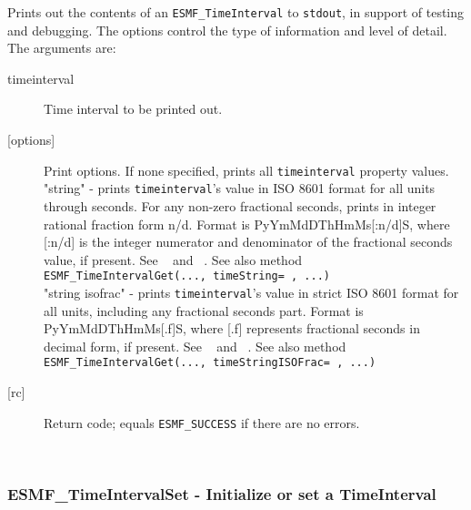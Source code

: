        Prints out the contents of an {\tt ESMF\_TimeInterval} to {\tt stdout},
       in support of testing and debugging.  The options control the type of
       information and level of detail. \\
  
       The arguments are:
       \begin{description}
       \item[timeinterval]
            Time interval to be printed out.
       \item[{[options]}]
            Print options.  If none specified, prints all {\tt timeinterval}
            property values. \\
            "string" - prints {\tt timeinterval}'s value in ISO 8601 format
                       for all units through seconds.  For any non-zero
                       fractional seconds, prints in integer rational
                       fraction form n/d.  Format is PyYmMdDThHmMs[:n/d]S,
                       where [:n/d] is the integer numerator and denominator
                       of the fractional seconds value, if present.
                       See ~\cite{ISO} and ~\cite{ISOnotes}.  See also method
                       {\tt ESMF\_TimeIntervalGet(..., timeString= , ...)} \\
            "string isofrac" - prints {\tt timeinterval}'s value in strict
                       ISO 8601 format for all units, including any fractional
                       seconds part.  Format is PyYmMdDThHmMs[.f]S, where [.f]
                       represents fractional seconds in decimal form,
                       if present.  See ~\cite{ISO} and ~\cite{ISOnotes}.
                       See also method {\tt ESMF\_TimeIntervalGet(..., timeStringISOFrac= , ...)} \\
       \item[{[rc]}]
            Return code; equals {\tt ESMF\_SUCCESS} if there are no errors.
       \end{description}
   
 
\mbox{}\hrulefill\ 
 
\subsubsection [ESMF\_TimeIntervalSet] {ESMF\_TimeIntervalSet - Initialize or set a TimeInterval}


